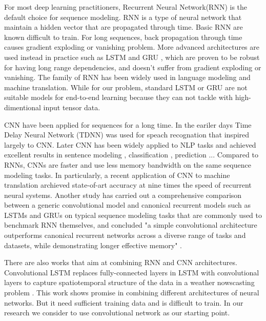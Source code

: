 For most deep learning practitioners, Recurrent Neural Network(RNN) is the default choice for sequence modeling. RNN is a type of neural network that maintain a hidden vector that are propagated through time. Basic RNN are known difficult to train. For long sequences, back propagation through time causes gradient exploding or vanishing problem. More advanced architectures are used instead in practice such as LSTM\cite{hochreiter1997long} and GRU \cite{collobert2008unified}, which are proven to be robust for having long range dependencies, and doesn't suffer from gradient exploding or vanishing. The family of RNN has been widely used in language modeling\cite{graves2013generating} and machine translation\cite{sutskever2014sequence}.  While for our problem, standard LSTM or GRU are not suitable models for end-to-end learning because they can not tackle with high-dimentional input tensor data. 

CNN have been applied for sequences for a long time. In the eariler days Time Delay Neural Network (TDNN) was used for speach recognation \cite{waibel1990phoneme} that inspired largely to CNN. Later CNN has been widely applied to NLP tasks and achieved excellent results in sentence modeling \cite{kalchbrenner2014convolutional}, classification \cite{kim2014convolutional}, prediction \cite{collobert2008unified}... Compared to RNNs, CNNs are faster and use less memory bandwidth on the same sequence modeling tasks. In particularly, a recent application of CNN to machine translation \cite{gehring2017convolutional} archieved state-of-art accuracy at nine times the speed of recurrent neural systems. Another study has carried out a comprehensive comparison between a generic convolutional model and canonical recurrent models such as LSTMs and GRUs on typical sequence modeling tasks that are commonly used to benchmark RNN themselves, and concluded "a simple convolutional architecture outperforms canonical recurrent networks across a diverse range of tasks and datasets, while demonstrating longer effective memory" \cite{bai2018empirical}. 

There are also works that aim at combining RNN and CNN architectures. Convolutional LSTM replaces fully-connected layers in LSTM with convolutional layers to capture spatiotemporal structure of the data in a weather nowscasting problem \cite{xingjian2015convolutional}. This work shows promise in combining different architectures of neural networks. But it need sufficient training data and is difficult to train. In our research we consider to use convolutional network as our starting point.


